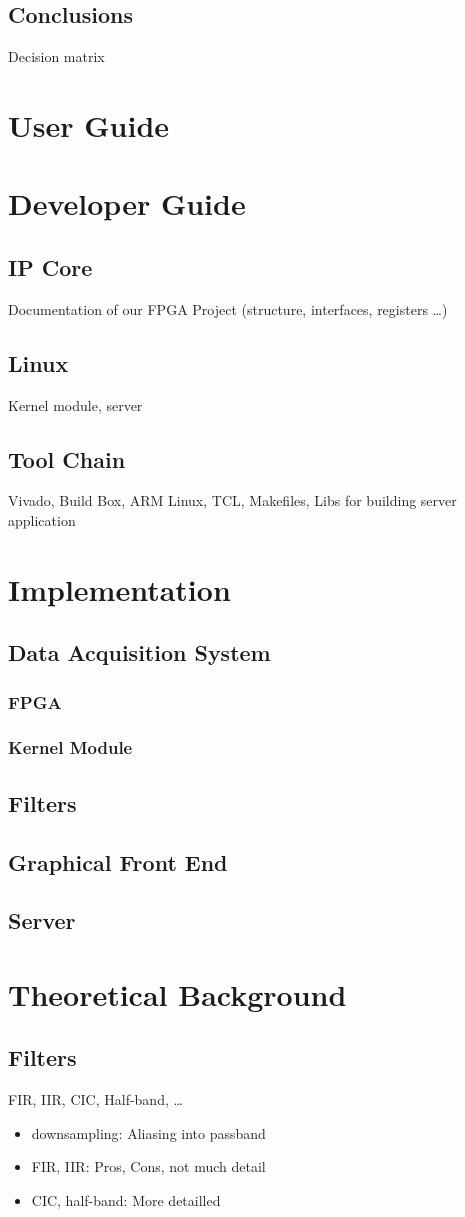 \documentclass{alpenthesis/alpenthesis}
\begin{document}
\chapter{Conclusions}
Decision matrix


\part{User Guide}

\part{Developer Guide}
\chapter{IP Core}
Documentation of our FPGA Project (structure, interfaces, registers \ldots)
\chapter{Linux}
Kernel module, server

\chapter{Tool Chain}
Vivado, Build Box, ARM Linux, TCL, Makefiles, Libs for building server application

\part{Implementation}
\chapter{Data Acquisition System}
\section{FPGA}
\section{Kernel Module}

\chapter{Filters}
\chapter{Graphical Front End}
\chapter{Server}

\part{Theoretical Background}
\chapter{Filters}
FIR, IIR, CIC, Half-band, \ldots
\begin{itemize}
    \item downsampling: Aliasing into passband
    \item FIR, IIR: Pros, Cons, not much detail
    \item CIC, half-band: More detailled
\end{itemize}
\end{document}
